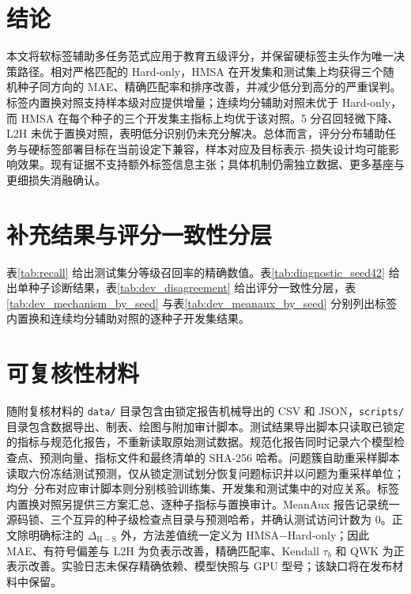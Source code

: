 \documentclass[UTF8,fontset=fandol,a4paper,11pt]{ctexart}
\begin{document}
\section{结论}

本文将软标签辅助多任务范式应用于教育五级评分，并保留硬标签主头作为唯一决策路径。相对严格匹配的 Hard-only，HMSA 在开发集和测试集上均获得三个随机种子同方向的 MAE、精确匹配率和排序改善，并减少低分到高分的严重误判。标签内置换对照支持样本级对应提供增量；连续均分辅助对照未优于 Hard-only，而 HMSA 在每个种子的三个开发集主指标上均优于该对照。5 分召回轻微下降、L2H 未优于置换对照，表明低分识别仍未充分解决。总体而言，评分分布辅助任务与硬标签部署目标在当前设定下兼容，样本对应及目标表示--损失设计均可能影响效果。现有证据不支持额外标签信息主张；具体机制仍需独立数据、更多基座与更细损失消融确认。

\FloatBarrier
\appendix

\section{补充结果与评分一致性分层}

表\ref{tab:recall} 给出测试集分等级召回率的精确数值。表\ref{tab:diagnostic_seed42} 给出单种子诊断结果，表\ref{tab:dev_disagreement} 给出评分一致性分层，表\ref{tab:dev_mechanism_by_seed} 与表\ref{tab:dev_meanaux_by_seed} 分别列出标签内置换和连续均分辅助对照的逐种子开发集结果。











\FloatBarrier

\section{可复核性材料}

随附复核材料的 \texttt{data/} 目录包含由锁定报告机械导出的 CSV 和 JSON，\texttt{scripts/} 目录包含数据导出、制表、绘图与附加审计脚本。测试结果导出脚本只读取已锁定的指标与规范化报告，不重新读取原始测试数据。规范化报告同时记录六个模型检查点、预测向量、指标文件和最终清单的 SHA-256 哈希。问题簇自助重采样脚本读取六份冻结测试预测，仅从锁定测试划分恢复问题标识并以问题为重采样单位；均分--分布对应审计脚本则分别核验训练集、开发集和测试集中的对应关系。标签内置换对照另提供三方案汇总、逐种子指标与置换审计。MeanAux 报告记录统一源码锁、三个互异的种子级检查点目录与预测哈希，并确认测试访问计数为 0。正文除明确标注的 $\Delta_{\mathrm{H-S}}$ 外，方法差值统一定义为 HMSA$-$Hard-only；因此 MAE、有符号偏差与 L2H 为负表示改善，精确匹配率、Kendall $\tau_b$ 和 QWK 为正表示改善。实验日志未保存精确依赖、模型快照与 GPU 型号；该缺口将在发布材料中保留。
\end{document}
